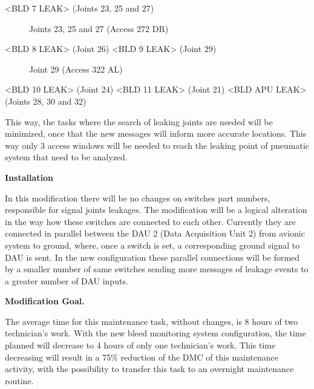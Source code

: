  <BLD 7 LEAK> (Joints 23, 25 and 27)



 \begin{figure}[H] %
\caption{Joints 23, 25 and 27 (Access 272 DR)}
\label{fig:joint23}
\end{figure}

 <BLD 8 LEAK> (Joint 26)
<BLD 9 LEAK> (Joint 29)



\begin{figure}[H] %
\caption{Joint 29 (Access 322 AL)}
\label{fig:322AL}
\end{figure}



<BLD 10 LEAK> (Joint 24)
<BLD 11 LEAK> (Joint 21)
<BLD APU LEAK> (Joints 28, 30 and 32)

This way, the tasks where the search of leaking joints are needed will be minimized, once that the new messages will inform more accurate locations. This way only 3 access windows will be needed to reach the leaking point of pneumatic system that need to be analyzed.

\textbf{Installation}

In this modification there will be no changes on switches part numbers, responsible for signal joints leakages. The modification will be a logical alteration in the way how these switches are connected to each other. Currently they are connected in parallel between the DAU 2 (Data Acquisition Unit 2) from avionic system to ground, where, once a switch is set, a corresponding ground signal to DAU is sent. In the new configuration these parallel connections will be formed by a smaller number of same switches sending more messages of leakage events to a greater number of DAU inputs.


\textbf{Modification Goal.}

The average time for this maintenance task, without changes, is 8 hours of two technician's work. With the new bleed monitoring system configuration, the time planned will decrease to 4 hours of only one technician's work. This time decreasing will result in a 75\% reduction of the DMC of this maintenance activity, with the possibility to transfer this task to an overnight maintenance routine.





